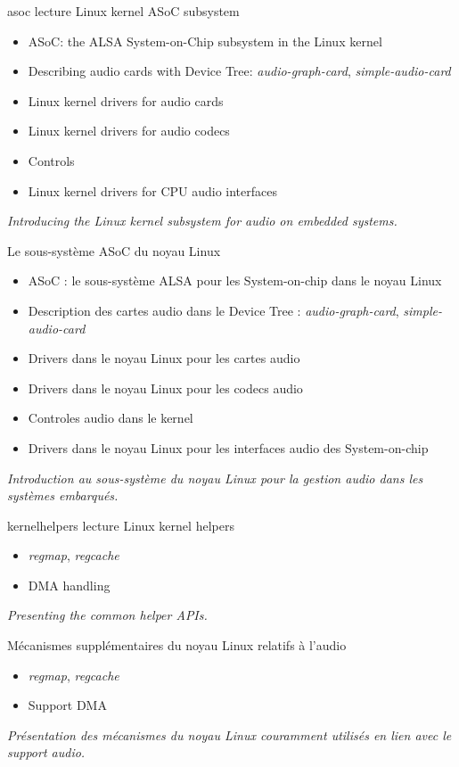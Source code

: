 {asoc}
{lecture}
{Linux kernel ASoC subsystem}
{
  \begin{itemize}
  \item ASoC: the ALSA System-on-Chip subsystem in the Linux kernel
  \item Describing audio cards with Device Tree: {\em
      audio-graph-card}, {\em simple-audio-card}
  \item Linux kernel drivers for audio cards
  \item Linux kernel drivers for audio codecs
  \item Controls
  \item Linux kernel drivers for CPU audio interfaces
  \end{itemize}
  \vspace{0.5em}
  {\em Introducing the Linux kernel subsystem for audio on embedded systems.}
}
{Le sous-système ASoC du noyau Linux}
{
  \begin{itemize}
  \item ASoC : le sous-système ALSA pour les System-on-chip dans le noyau Linux
  \item Description des cartes audio dans le Device Tree : {\em
      audio-graph-card}, {\em simple-audio-card}
  \item Drivers dans le noyau Linux pour les cartes audio
  \item Drivers dans le noyau Linux pour les codecs audio
  \item Controles audio dans le kernel
  \item Drivers dans le noyau Linux pour les interfaces audio des
    System-on-chip
  \end{itemize}
  \vspace{0.5em}
  {\em Introduction au sous-système du noyau Linux pour la gestion audio dans les systèmes embarqués.}
}
{kernelhelpers}
{lecture}
{Linux kernel helpers}
{
  \begin{itemize}
  \item {\em regmap}, {\em regcache}
  \item DMA handling
  \end{itemize}
  \vspace{0.5em}
  {\em Presenting the common helper APIs.}
}
{Mécanismes supplémentaires du noyau Linux relatifs à l'audio}
{
  \begin{itemize}
  \item {\em regmap}, {\em regcache}
  \item Support DMA
  \end{itemize}
  \vspace{0.5em}
  {\em Présentation des mécanismes du noyau Linux couramment utilisés en lien avec le support audio.}
}
